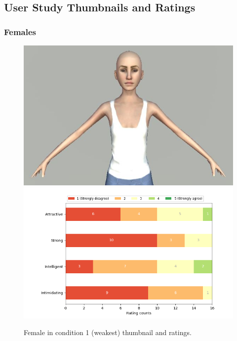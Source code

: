 \subsection{User Study Thumbnails and Ratings}
\label{subsection:thumbnailsExperiment}
\subsubsection{Females}
\begin{figure}[H]
  \includegraphics[width=\linewidth]{Images/Females/10.JPG}
\endminipage\hfill
{}
  \includegraphics[width=\linewidth]{Survey/avatar_f_experiment1.png}
\endminipage\hfill
\caption{Female in condition 1 (weakest) thumbnail and ratings.}
\end{figure}

